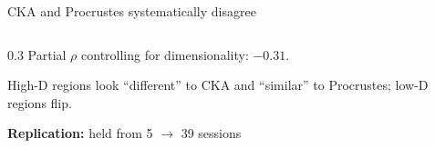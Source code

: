 \documentclass[aspectratio=169,11pt]{beamer}
\begin{document}
\begin{frame}{CKA and Procrustes systematically disagree}
\begin{columns}[T]
\begin{column}{0.3\textwidth}
\vspace{0.5em}
{\small Partial $\rho$ controlling for dimensionality: $-0.31$.}

\vspace{0.5em}
{\small High-D regions look ``different'' to CKA and ``similar'' to Procrustes; low-D regions flip.}

\vspace{0.5em}
{\small \textcolor{pass}{\textbf{Replication:}} held from 5 $\to$ 39 sessions}
\end{column}
\end{columns}
\end{frame}

\end{document}
